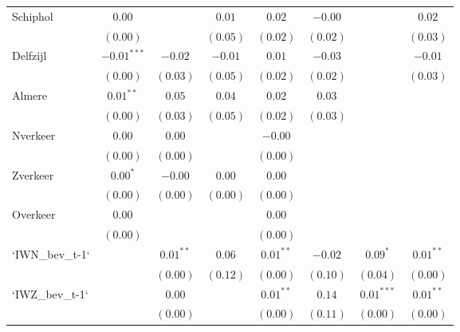 \begin{center}
\begin{longtable}{l c c c c c c c }
Schiphol         & $0.00$        &             & $0.01$       & $0.02$        & $-0.00$       &               & $0.02$        \\
                 & $(0.00)$      &             & $(0.05)$     & $(0.02)$      & $(0.02)$      &               & $(0.03)$      \\
Delfzijl         & $-0.01^{***}$ & $-0.02$     & $-0.01$      & $0.01$        & $-0.03$       &               & $-0.01$       \\
                 & $(0.00)$      & $(0.03)$    & $(0.05)$     & $(0.02)$      & $(0.02)$      &               & $(0.03)$      \\
Almere           & $0.01^{**}$   & $0.05$      & $0.04$       & $0.02$        & $0.03$        &               &               \\
                 & $(0.00)$      & $(0.03)$    & $(0.05)$     & $(0.02)$      & $(0.03)$      &               &               \\
Nverkeer         & $0.00$        & $0.00$      &              & $-0.00$       &               &               &               \\
                 & $(0.00)$      & $(0.00)$    &              & $(0.00)$      &               &               &               \\
Zverkeer         & $0.00^{*}$    & $-0.00$     & $0.00$       & $0.00$        &               &               &               \\
                 & $(0.00)$      & $(0.00)$    & $(0.00)$     & $(0.00)$      &               &               &               \\
Overkeer         & $0.00$        &             &              & $0.00$        &               &               &               \\
                 & $(0.00)$      &             &              & $(0.00)$      &               &               &               \\
`IWN\_bev\_t-1`  &               & $0.01^{**}$ & $0.06$       & $0.01^{**}$   & $-0.02$       & $0.09^{*}$    & $0.01^{**}$   \\
                 &               & $(0.00)$    & $(0.12)$     & $(0.00)$      & $(0.10)$      & $(0.04)$      & $(0.00)$      \\
`IWZ\_bev\_t-1`  &               & $0.00$      &              & $0.01^{**}$   & $0.14$        & $0.01^{***}$  & $0.01^{**}$   \\
                 &               & $(0.00)$    &              & $(0.00)$      & $(0.11)$      & $(0.00)$      & $(0.00)$      \\

\end{longtable}
\end{center}
